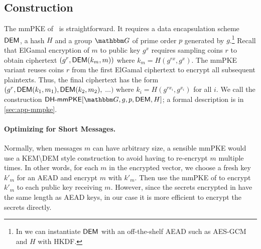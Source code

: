 
\subsection{Construction}
The mmPKE of~\cite{ASIACCS:PinPoeSch14} is straightforward. It requires a
data encapsulation scheme ${\mathsf{DEM}}$, a hash $H$ and a group $\Grp$ of prime order $p$ generated by $g$.\footnote{In \saik we can instantiate ${\mathsf{DEM}}$ with an off-the-shelf
AEAD such as AES-GCM and $H$ with HKDF.} Recall that
ElGamal encryption of $m$ to public key $g^x$ requires sampling coins $r$ to
obtain ciphertext $(g^r, {\mathsf{DEM}}(k_m, m))$ where $k_m = H(g^{rx}, g^x)$. The
mmPKE variant reuses coins $r$ from the first ElGamal ciphertext to encrypt
all subsequent plaintexts. Thus, the final ciphertext has the form $(g^r,
{\mathsf{DEM}}(k_1, m_1), {\mathsf{DEM}}(k_2, m_2),$ $\ldots)$ where $k_i = H(g^{rx_i},
g^{x_i})$ for all $i$. We call the construction $\dhmmpke[\Grp,\allowbreak g,\allowbreak p,\allowbreak \dem, H]$; a formal description is in \cref{sec:app-mmpke}.

\paragraph{Optimizing for Short Messages.}
Normally, when messages $m$ can have arbitrary size, a sensible mmPKE would use a
KEM{\textbackslash}DEM style construction to avoid having to re-encrypt $m$
multiple times. In other words, for each $m$ in the encrypted vector, we choose a fresh key $k'_m$
for an AEAD and encrypt $m$ with $k'_m$. Then use the mmPKE of
\cite{ASIACCS:PinPoeSch14} to encrypt $k'_m$ to each public key receiving $m$.
However, since the secrets encrypted in \saik have the same length as AEAD
keys, in our case it is more efficient to encrypt the secrets directly.


